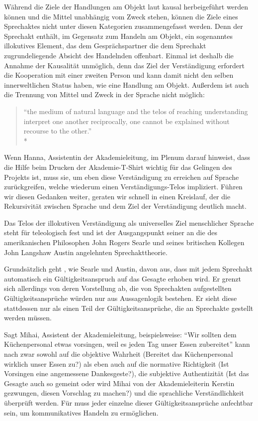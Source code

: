 Während die Ziele der Handlungen am Objekt laut \citeauthor{Habermas-1998-aa} kausal herbeigeführt werden können und die Mittel unabhängig vom Zweck stehen, können die Ziele eines Sprechaktes nicht unter diesen Kategorien zusammengefasst werden.
Denn der Sprechakt enthält, im Gegensatz zum Handeln am Objekt, ein sogenanntes illokutives Element, das dem Gesprächspartner die dem Sprechakt zugrundeliegende Absicht des Handelnden offenbart.
Einmal ist deshalb die Annahme der Kausalität unmöglich, denn das Ziel der Verständigung erfordert die Kooperation mit einer zweiten Person und kann damit nicht den selben innerweltlichen Status haben, wie eine Handlung am Objekt.
Außerdem ist auch die Trennung von Mittel und Zweck in der Sprache nicht möglich:

\begin{quote}
	``the medium of natural language and the telos of reaching understanding interpret one another reciprocally, one cannot be explained without recourse to the other.''\\*
	\parencite[218]{Habermas-1998-aa}
\end{quote}

Wenn Hanna, Assistentin der Akademieleitung, im Plenum darauf hinweist, dass die Hilfe beim Drucken der Akademie-T-Shirt wichtig für das Gelingen des Projekts ist, muss sie, um eben diese Verständigung zu erreichen auf Sprache zurückgreifen, welche wiederum einen Verständigungs-Telos impliziert.
Führen wir diesen Gedanken weiter, geraten wir schnell in einen Kreislauf, der die Rekursivität zwischen Sprache und dem Ziel der Verständigung deutlich macht.

Das Telos der illokutiven Verständigung als universelles Ziel menschlicher Sprache steht für \citeauthor{Habermas-1998-aa} teleologisch fest und ist der Ausgangspunkt seiner an die des amerikanischen Philosophen John Rogers Searle und seines britischen Kollegen John Langshaw Austin angelehnten Sprechakttheorie.

Grundsätzlich geht \citeauthor{Habermas-1998-aa}, wie Searle und Austin, davon aus, dass mit jedem Sprechakt automatisch ein Gültigkeitsanspruch auf das Gesagte erhoben wird.
Er grenzt sich allerdings von deren Vorstellung ab, die von Sprechakten aufgestellten Gültigkeitsansprüche würden nur aus Aussagenlogik bestehen.
Er sieht diese stattdessen nur als einen Teil der Gültigkeitsansprüche, die an Sprechakte gestellt werden müssen.

Sagt Mihai, Assistent der Akademieleitung, beispielsweise: ``Wir sollten dem Küchenpersonal etwas vorsingen, weil es jeden Tag unser Essen zubereitet'' kann nach \citeauthor{Habermas-1998-aa} zwar sowohl auf die objektive Wahrheit (Bereitet das Küchenpersonal wirklich unser Essen zu?) als eben auch auf die normative Richtigkeit (Ist Vorsingen eine angemessene Dankesgeste?), die subjektive Authentizität (Ist das Gesagte auch so gemeint oder wird Mihai von der Akademieleiterin Kerstin gezwungen, diesen Vorschlag zu machen?) und die sprachliche Verständlichkeit überprüft werden.
Für \citeauthor{Habermas-1998-aa} muss jeder einzelne dieser Gültigkeitsansprüche anfechtbar sein, um kommunikatives Handeln zu ermöglichen.

